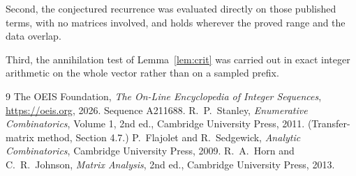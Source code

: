 \documentclass[11pt,a4paper]{article}
\theoremstyle{plain}
\theoremstyle{definition}
\begin{document}
Second, the conjectured recurrence was evaluated directly on those published terms, with no
matrices involved, and holds wherever the proved range and the data overlap.

Third, the annihilation test of Lemma~\ref{lem:crit} was carried out in exact integer
arithmetic on the whole vector rather than on a sampled prefix.

\begin{thebibliography}{9}
 The OEIS Foundation, \emph{The On-Line Encyclopedia of Integer
Sequences}, \url{https://oeis.org}, 2026. Sequence A211688.
 R.~P.~Stanley, \emph{Enumerative Combinatorics}, Volume 1, 2nd ed.,
Cambridge University Press, 2011. (Transfer-matrix method, Section 4.7.)
 P.~Flajolet and R.~Sedgewick, \emph{Analytic Combinatorics}, Cambridge
University Press, 2009.
 R.~A.~Horn and C.~R.~Johnson, \emph{Matrix Analysis}, 2nd ed., Cambridge
University Press, 2013.
\end{thebibliography}
\end{document}
